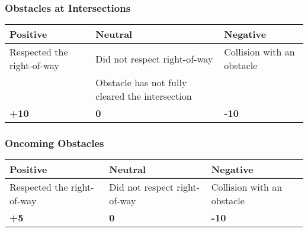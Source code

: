{\begin{highlight}
		\subsubsection*{Obstacles at Intersections}
		\begin{table}[H]
			\begin{tabularx}{\textwidth}{XXX}
				\toprule
				\textbf{Positive}          & \textbf{Neutral}                                & \textbf{Negative}          \\
				\midrule
				Respected the right-of-way \footnotemark[2] & Did not respect right-of-way \footnotemark[2]                    & Collision with an obstacle \\
				                           & Obstacle has not fully cleared the intersection &                            \\
				\topstrut
				\textbf{+10}               & \textbf{0}                                      & \textbf{-10}               \\
				\bottomrule
			\end{tabularx}
		\end{table}

		\subsubsection*{Oncoming Obstacles}
		\begin{table}[H]
			\begin{tabularx}{\textwidth}{XXX}
				\toprule
				\textbf{Positive}                           & \textbf{Neutral}             & \textbf{Negative}          \\
				\midrule
				Respected the right-of-way \footnotemark[2] & Did not respect right-of-way \footnotemark[2] & Collision with an obstacle \\
				\topstrut
				\textbf{+5}                                 & \textbf{0}                   & \textbf{-10}               \\
				\bottomrule
			\end{tabularx}
		\end{table}

		\newpage


\end{highlight}}
